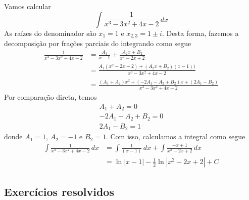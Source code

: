 \begin{ex}
  Vamos calcular
  \begin{equation}
    \int \frac{1}{x^3 - 3x^2 + 4x -2}\,dx
  \end{equation}
  As raízes do denominador são $x_1=1$ e $x_{2,3} = 1 \pm i$. Desta forma, fazemos a decomposição por frações parciais do integrando como segue 
  \begin{align}
    \frac{1}{x^3 - 3x^2 + 4x -2} &= \frac{A_1}{x-1} + \frac{A_2x + B_2}{x^2 - 2x + 2}\\
                                 &= \frac{A_1(x^2-2x+2) + (A_2x+B_2)(x-1))}{x^3-3x^2+4x-2}\\
                                 &= \frac{(A_1+A_2)x^2+(-2A_1-A_2+B_2)x+(2A_1-B_2)}{x^3-3x^2+4x-2}
  \end{align}
  Por comparação direta, temos
  \begin{gather}
    A_1+A_2 = 0\\
    -2A_1-A_2+B_2 = 0\\
    2A_1-B_2 = 1
  \end{gather}
  donde $A_1=1$, $A_2=-1$ e $B_2=1$. Com isso, calculamos a integral como segue
  \begin{align}
    \int \frac{1}{x^3 - 3x^2 + 4x -2}\,dx &= \int\frac{1}{(x-1)}\,dx + \int\frac{-x+1}{x^2 - 2x + 2}\,dx\\
                                          &= \ln|x-1| -\frac{1}{2}\ln|x^2-2x+2| + C
  \end{align}
\end{ex}

\subsection*{Exercícios resolvidos}

